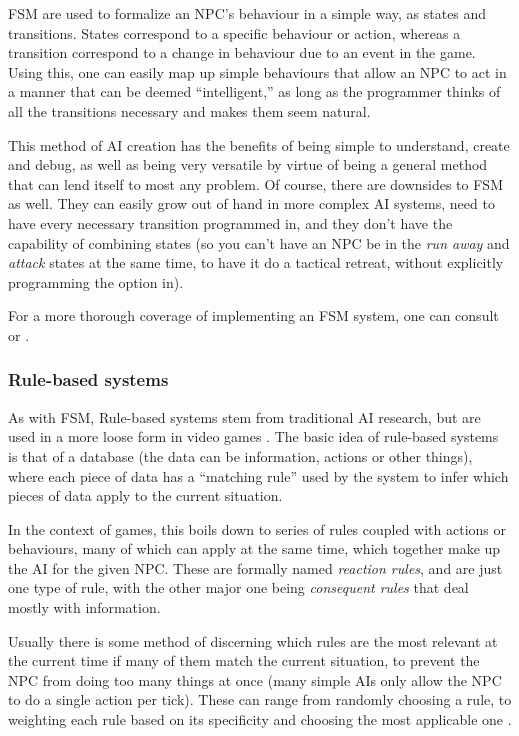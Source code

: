 \documentclass[]{report}
\begin{document}
FSM are used to formalize an NPC's behaviour in a simple way, as states and
transitions. States correspond to a specific behaviour or action, whereas a
transition correspond to a change in behaviour due to an event in the
game. Using this, one can easily map up simple behaviours that allow an NPC to
act in a manner that can be deemed ``intelligent,'' as long as the programmer
thinks of all the transitions necessary and makes them seem natural.

This method of AI creation has the benefits of being simple to understand,
create and debug, as well as being very versatile by virtue of being a general
method that can lend itself to most any problem. Of course, there are downsides
to FSM as well. They can easily grow out of hand in more complex AI systems,
need to have every necessary transition programmed in, and they don't have the
capability of combining states (so you can't have an NPC be in the \emph{run
  away} and \emph{attack} states at the same time, to have it do a tactical
retreat, without explicitly programming the option in).

For a more thorough coverage of implementing an FSM system, one can consult
\citet{rabin2002implementing} or \citet[][chap.~3]{kirby2011introduction}.

\subsubsection{Rule-based systems}
\label{sec:rule-based-systems}

As with FSM, Rule-based systems stem from traditional AI research, but are used
in a more loose form in video games \citep{christian2002simple}. The basic idea
of rule-based systems is that of a database (the data can be information,
actions or other things), where each piece of data has a ``matching rule'' used
by the system to infer which pieces of data apply to the current situation.

In the context of games, this boils down to series of rules coupled with actions
or behaviours, many of which can apply at the same time, which together make up
the AI for the given NPC. These are formally named \emph{reaction rules}, and
are just one type of rule, with the other major one being \emph{consequent
  rules} that deal mostly with information.

Usually there is some method of discerning which rules are the most relevant at
the current time if many of them match the current situation, to prevent the NPC
from doing too many things at once (many simple AIs only allow the NPC to do a
single action per tick). These can range from randomly choosing a rule, to
weighting each rule based on its specificity and choosing the most applicable
one \citep{Freeman-Hargis}.
\end{document}
